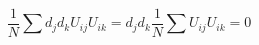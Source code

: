 \begin{equation}
	\frac{1}{N}\sum d_{j}d_{k}U_{ij}U_{ik}=d_{j}d_{k}\frac{1}{N}\sum U_{ij}U_{ik}=0
\end{equation}
